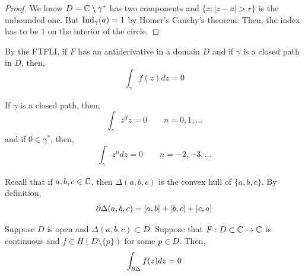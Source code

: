 \documentclass[12pt]{amsart}
\begin{document}
\begin{proof}
    We know $D = \mathbb C \setminus \gamma^*$ has two components and $\{z : |z-a| > r\}$ is the unbounded one. But $\operatorname{Ind}_\gamma(a) = 1$ by Homer's Cauchy's theorem. Then, the index has to be $1$ on the interior of the circle. 
\end{proof}

\begin{remark}
    By the FTFLI, if $F$ has an antiderivative in a domain $D$ and if $\gamma$ is a closed path in $D$, then, 
    \[ \int_\gamma f(z) dz = 0 \]
\end{remark}

\begin{lemma}
    If $\gamma$ is a closed path, then, 
    \[ \int_\gamma z^dz = 0 \qquad n = 0, 1, \ldots\]
    and if $0 \in \gamma^*$, then, 
    \[ \int_\gamma z^ndz = 0 \qquad n = -2, -3, \ldots\]
\end{lemma}

\begin{remark}
    Recall that if $a,b,c \in \mathbb C$, then $\Delta(a,b,c)$ is the convex hull of $\{a,b,c\}$. By definition,
    \[ \partial\Delta(a,b,c) = [a,b] + [b,c] + [c,a]\]
\end{remark}

\begin{theorem}
    Suppose $D$ is open and $\Delta(a,b,c) \subset D$. Suppose that $F: D \subset \mathbb C \to \mathbb C$ is continuous and $f \in H(D \setminus \{p\})$ for some $p \in D$. Then, 
    \[ \int_{\partial\Delta} f(z)dz = 0\]
\end{theorem}
\end{document}
